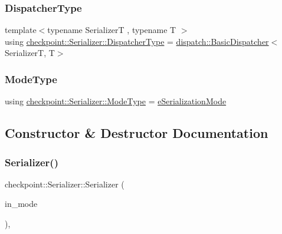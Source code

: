 \subsubsection{\texorpdfstring{Dispatcher\+Type}{DispatcherType}}
{\footnotesize\ttfamily template$<$typename SerializerT , typename T $>$ \\
using \hyperlink{structcheckpoint_1_1_serializer_ad8effc5884f1ed37b6b4507422f6d72c}{checkpoint\+::\+Serializer\+::\+Dispatcher\+Type} =  \hyperlink{structcheckpoint_1_1dispatch_1_1_basic_dispatcher}{dispatch\+::\+Basic\+Dispatcher}$<$SerializerT, T$>$}

\mbox{\label{structcheckpoint_1_1_serializer_a4c307e2592dc4224d8a13148109c5764}} 
\subsubsection{\texorpdfstring{Mode\+Type}{ModeType}}
{\footnotesize\ttfamily using \hyperlink{namespacecheckpoint_ae2509499ccd8b1dc48fb535bf8aa3059}{checkpoint\+::\+Serializer\+::\+Mode\+Type} =  \hyperlink{namespacecheckpoint_ae2509499ccd8b1dc48fb535bf8aa3059}{e\+Serialization\+Mode}}



\subsection{Constructor \& Destructor Documentation}
\mbox{\label{structcheckpoint_1_1_serializer_a4007a463384ec96a4c21bd7f049f0be5}} 
\subsubsection{\texorpdfstring{Serializer()}{Serializer()}}
{\footnotesize\ttfamily checkpoint\+::\+Serializer\+::\+Serializer (\begin{DoxyParamCaption}\item[{\hyperlink{namespacecheckpoint_ae2509499ccd8b1dc48fb535bf8aa3059}{Mode\+Type} const \&}]{in\+\_\+mode }\end{DoxyParamCaption})\hspace{0.3cm}{\ttfamily [inline]}, {\ttfamily [explicit]}}



